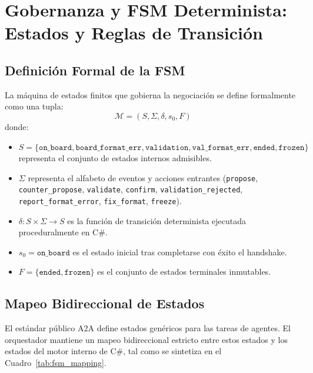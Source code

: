 \section{Gobernanza y FSM Determinista: Estados y Reglas de Transición}
\label{sec:fsm}

\subsection{Definición Formal de la FSM}
La máquina de estados finitos que gobierna la negociación se define formalmente como una tupla:
\begin{equation}
    \mathcal{M} = (S, \Sigma, \delta, s_0, F)
\end{equation}
donde:
\begin{itemize}
    \item $S = \{\texttt{on\_board}, \texttt{board\_format\_err}, \texttt{validation}, \texttt{val\_format\_err}, \texttt{ended}, \texttt{frozen}\}$ representa el conjunto de estados internos admisibles.
    \item $\Sigma$ representa el alfabeto de eventos y acciones entrantes (\texttt{propose}, \texttt{counter\_propose}, \texttt{validate}, \texttt{confirm}, \texttt{validation\_rejected}, \texttt{report\_format\_error}, \texttt{fix\_format}, \texttt{freeze}).
    \item $\delta: S \times \Sigma \rightarrow S$ es la función de transición determinista ejecutada proceduralmente en C\#.
    \item $s_0 = \texttt{on\_board}$ es el estado inicial tras completarse con éxito el handshake.
    \item $F = \{\texttt{ended}, \texttt{frozen}\}$ es el conjunto de estados terminales inmutables.
\end{itemize}

\subsection{Mapeo Bidireccional de Estados}
El estándar público A2A define estados genéricos para las tareas de agentes. El orquestador mantiene un mapeo bidireccional estricto entre estos estados y los estados del motor interno de C\#, tal como se sintetiza en el Cuadro~\ref{tab:fsm_mapping}.

